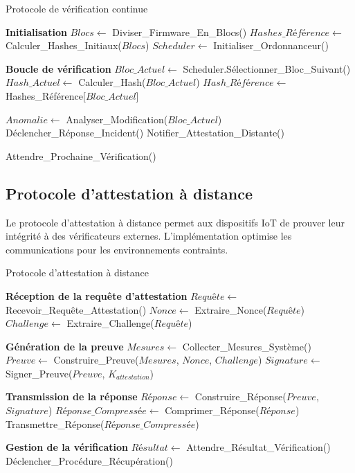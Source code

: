 \begin{algorithm}
\caption{Protocole de vérification continue}
\label{alg:continuous-verification}
\begin{algorithmic}[1]
\State \textbf{Initialisation}
\State $Blocs \leftarrow$ Diviser\_Firmware\_En\_Blocs()
\State $Hashes\_Référence \leftarrow$ Calculer\_Hashes\_Initiaux($Blocs$)
\State $Scheduler \leftarrow$ Initialiser\_Ordonnanceur()

\State \textbf{Boucle de vérification}
    \State $Bloc\_Actuel \leftarrow$ Scheduler.Sélectionner\_Bloc\_Suivant()
    \State $Hash\_Actuel \leftarrow$ Calculer\_Hash($Bloc\_Actuel$)
    \State $Hash\_Référence \leftarrow$ Hashes\_Référence[$Bloc\_Actuel$]
    
        \State $Anomalie \leftarrow$ Analyser\_Modification($Bloc\_Actuel$)
            \State Déclencher\_Réponse\_Incident()
            \State Notifier\_Attestation\_Distante()
        \EndIf
    \EndIf
    
    \State Attendre\_Prochaine\_Vérification()
\EndWhile
\end{algorithmic}
\end{algorithm}

\subsection{Protocole d'attestation à distance}

Le protocole d'attestation à distance permet aux dispositifs IoT de prouver leur intégrité à des vérificateurs externes. L'implémentation optimise les communications pour les environnements contraints.

\begin{algorithm}
\caption{Protocole d'attestation à distance}
\label{alg:remote-attestation}
\begin{algorithmic}[1]
\State \textbf{Réception de la requête d'attestation}
\State $Requête \leftarrow$ Recevoir\_Requête\_Attestation()
\State $Nonce \leftarrow$ Extraire\_Nonce($Requête$)
\State $Challenge \leftarrow$ Extraire\_Challenge($Requête$)

\State \textbf{Génération de la preuve}
\State $Mesures \leftarrow$ Collecter\_Mesures\_Système()
\State $Preuve \leftarrow$ Construire\_Preuve($Mesures$, $Nonce$, $Challenge$)
\State $Signature \leftarrow$ Signer\_Preuve($Preuve$, $K_{attestation}$)

\State \textbf{Transmission de la réponse}
\State $Réponse \leftarrow$ Construire\_Réponse($Preuve$, $Signature$)
\State $Réponse\_Compressée \leftarrow$ Comprimer\_Réponse($Réponse$)
\State Transmettre\_Réponse($Réponse\_Compressée$)

\State \textbf{Gestion de la vérification}
\State $Résultat \leftarrow$ Attendre\_Résultat\_Vérification()
    \State Déclencher\_Procédure\_Récupération()
\EndIf
\end{algorithmic}
\end{algorithm}

